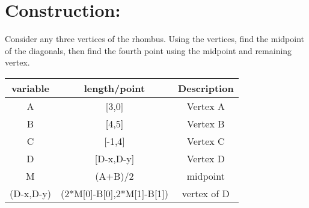 \documentclass[a4paper,12pt,twocolumn]{article}
\begin{document}
\section{Construction:}
Consider any  three vertices of the rhombus. Using the vertices, find the midpoint of the diagonals, then find the fourth point using the midpoint and remaining vertex. 
\begin{table}[H]
	\centering
\setlength\extrarowheight{2pt}
	\begin{tabular}{|c|c|c|}
		\hline
		\textbf{variable} & \textbf{length/point} & \textbf{Description}\\
		\hline
		A & [3,0] & Vertex A\\
		\hline
		B & [4,5] & Vertex B\\
		\hline
		C & [-1,4] & Vertex C\\
		\hline                   
		D & [D-x,D-y] & Vertex D\\
		\hline
		M & (A+B)/2 & midpoint\\
		\hline
		(D-x,D-y) & (2*M[0]-B[0],2*M[1]-B[1]) & vertex of D\\
		\hline
	\end{tabular}
\end{table}
\end{document}
